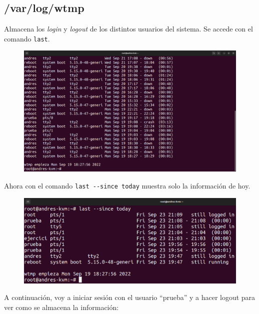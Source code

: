 \documentclass{article}
\begin{document}

\subsection*{/var/log/wtmp}
Almacena los \textit{login} y \textit{logout} de los distintos usuarios del sistema. Se accede con el comando \verb|last|. 

\begin{figure}[H]
    \includegraphics[width=\textwidth]{imagenes/lastnormal.png}
\end{figure}

\bigskip

Ahora con el comando \verb|last --since today| muestra solo la información de hoy.

\begin{figure}[H]
    \includegraphics[width=\textwidth]{imagenes/lasttoday.png}
\end{figure}

\newpage

A continuación, voy a iniciar sesión con el usuario ``prueba'' y a hacer logout para ver como se almacena la información:
\end{document}
